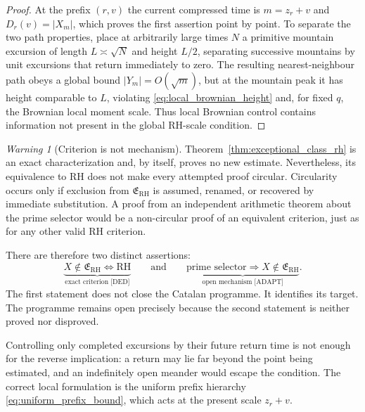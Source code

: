 \documentclass[11pt]{amsart}
\numberwithin{equation}{section}
\theoremstyle{plain}
\theoremstyle{definition}
\theoremstyle{remark}
\newtheorem{warning}[theorem]{Warning}
\begin{document}
\begin{proof}
At the prefix $(r,v)$ the current compressed time is $m=z_r+v$ and
$D_r(v)=|X_m|$, which proves the first assertion point by point.  To separate
the two path properties, place at arbitrarily large times $N$ a primitive
mountain excursion of length $L\asymp\sqrt N$ and height $L/2$, separating
successive mountains by unit excursions that return immediately to zero.  The
resulting
nearest-neighbour path obeys a global bound $|Y_m|=O(\sqrt m)$, but at the
mountain peak it has height comparable to $L$, violating
\eqref{eq:local_brownian_height} and, for fixed $q$, the Brownian local moment
scale.  Thus local Brownian control contains information not present in the
global RH-scale condition.
\end{proof}

\begin{warning}[Criterion is not mechanism]
\label{warn:criterion_not_mechanism}
Theorem~\ref{thm:exceptional_class_rh} is an exact characterization and, by
itself, proves no new estimate.  Nevertheless, its equivalence to RH does not
make every attempted proof circular.  Circularity occurs only if exclusion
from $\mathfrak E_{\mathrm{RH}}$ is assumed, renamed, or recovered by immediate
substitution.  A proof from an independent arithmetic theorem about the prime
selector would be a non-circular proof of an equivalent criterion, just as for
any other valid RH criterion.
\end{warning}

There are therefore two distinct assertions:
\begin{equation}
\underbrace{X\notin\mathfrak E_{\mathrm{RH}}\iff\mathrm{RH}}
_{\text{exact criterion [DED]}}
\qquad\text{and}\qquad
\underbrace{\text{prime selector}\Longrightarrow
X\notin\mathfrak E_{\mathrm{RH}}}
_{\text{open mechanism [ADAPT]}}.
\label{eq:criterion_mechanism_split}
\end{equation}
The first statement does not close the Catalan programme.  It identifies its
target.  The programme remains open precisely because the second statement is
neither proved nor disproved.

Controlling only completed excursions by their future return time is not
enough for the reverse implication: a return may lie far beyond the point
being estimated, and an indefinitely open meander would escape the condition.
The correct local formulation is the uniform prefix hierarchy
\eqref{eq:uniform_prefix_bound}, which acts at the present scale $z_r+v$.
\end{document}
